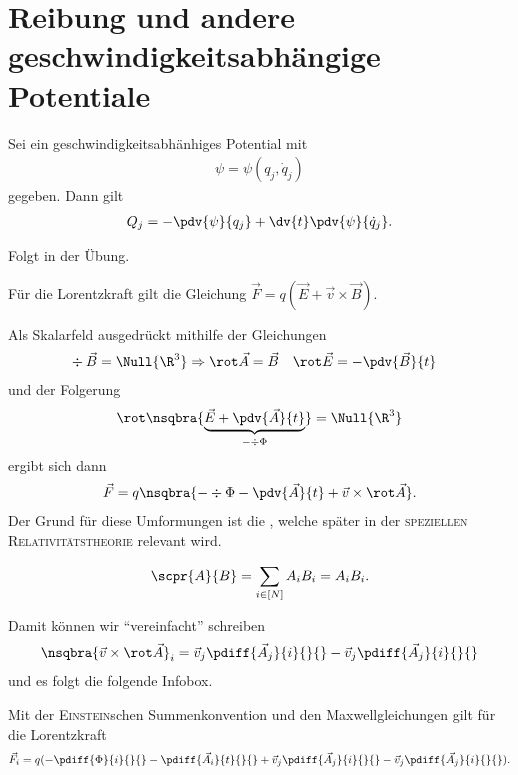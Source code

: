 \documentclass[../main.tex]{subfiles}
\begin{document}
		\section{Reibung und andere geschwindigkeitsabhängige Potentiale}
				\begin{Behauptung}
					Sei ein geschwindigkeitsabhänhiges Potential mit
				\begin{align*}
					\psi=\psi(q_j,\dot q_j)
				\end{align*}
				gegeben. Dann gilt 
				\begin{align*}
					Q_j=-\pdv{\psi}{q_j}+\dv{t}\pdv{\psi}{\dot q_j}. 
				\end{align*}
			\end{Behauptung}
			\begin{begruendung}
				Folgt in der Übung.
			\end{begruendung}
			\begin{Erinnerung}
				Für die Lorentzkraft gilt die Gleichung $\vec{F}=q(\vec{E}+\vec{v}\times\vec{B})$. 
			\end{Erinnerung}
			Als Skalarfeld ausgedrückt mithilfe der Gleichungen 
			\begin{align*}
				&\div\vec{B}=\Null{\R^3}\Rightarrow \rot\vec A=\vec	B &&\rot\vec{E}=-\pdv{\vec{B}}{t}
			\end{align*}
			und der Folgerung 
			\begin{align*}
				\rot\nsqbra{\underbrace{\vec{E}+\pdv{\vec{A}}{t}}_{-\div\Phi}}=\Null{\R^3}
			\end{align*}
			ergibt sich dann 
			\begin{align*}
				\vec{F}=q\nsqbra{-\div\Phi-\pdv{\vec{A}}{t}+\vec{v}\times\rot\vec{A}}.
			\end{align*}
			Der Grund für diese Umformungen ist die , welche später in der \textsc{speziellen Relativitätstheorie} relevant wird. 
			\begin{info}
				\begin{align*}
					\scpr{A}{B}=\sum_{i\in[N]}A_iB_i=A_iB_i.
				\end{align*}
			\end{info}
			\noindent Damit können wir \enquote{vereinfacht} schreiben
			\begin{align*}
				\nsqbra{\vec{v}\times\rot\vec{A}}_i=\vec{v}_j\pdiff{\vec{A}_j}{i}{}{}-\vec{v}_j\pdiff{\vec{A}_j}{i}{}{}
			\end{align*}
			und es folgt die folgende Infobox.
			\begin{info}
				Mit der \textsc{Einstein}schen Summenkonvention und den Maxwellgleichungen gilt für die Lorentzkraft
				\begin{align*}
					\vec{F}_i=q(-\pdiff{\Phi}{i}{}{}-\pdiff{\vec{A}_i}{t}{}{}+\vec{v}_j\pdiff{\vec{A}_j}{i}{}{}-\vec{v}_j\pdiff{\vec{A}_j}{i}{}{}). 
				\end{align*}
			\end{info}
\end{document}
